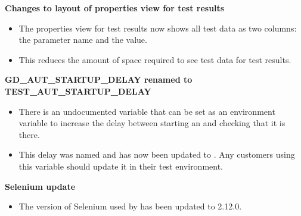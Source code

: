 \textbf{Changes to layout of properties view for test results}\\
\begin{itemize}
\item The properties view for test results now shows all test data as two columns: the parameter name and the value.
\item This reduces the amount of space required to see test data for test results. 
\end{itemize} 


\textbf{GD\_AUT\_STARTUP\_DELAY renamed to TEST\_AUT\_STARTUP\_DELAY}\\
\begin{itemize}
\item There is an undocumented variable that can be set as an environment variable to increase the delay between starting an \gdaut{} and checking that it is there.
\item This delay was named  and has now been updated to . Any customers using this variable should update it in their test environment. 
\end{itemize}

\textbf{Selenium update}
\begin{itemize}
\item The version of Selenium used by \app{} has been updated to 2.12.0.
\end{itemize}
